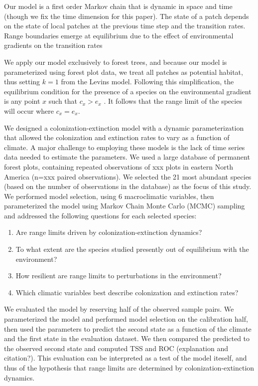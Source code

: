 \documentclass[11pt]{article}
\begin{document}
Our model is a first order Markov chain that is dynamic in space and time (though we fix the time dimension for this paper). The state of a patch depends on the state of local patches at the previous time step and the transition rates. Range boundaries emerge at equilibrium due to the effect of environmental gradients on the transition rates

We apply our model exclusively to forest trees, and because our model is parameterized using forest plot data, we treat all patches as potential habitat, thus setting $k=1$ from the Levins model.
Following this simplification, the equilibrium condition for the presence of a species on the environmental gradient is any point $x$ such that $c_x > e_x$ \citep{Holt2000}.
It follows that the range limit of the species will occur where $c_x = e_x$.


We designed a colonization-extinction model with a dynamic parameterization that allowed the colonization and extinction rates to vary as a function of climate.
A major challenge to employing these models is the lack of time series data needed to estimate the parameters.
We used a large database of permanent forest plots, containing repeated observations of xxx plots in eastern North America (n=xxx paired observations). 
We selected the 21 most abundant species (based on the number of observations in the database) as the focus of this study.
We performed model selection, using 6 macroclimatic variables, then parameterized the model using Markov Chain Monte Carlo (MCMC) sampling and addressed the following questions for each selected species:
\begin{enumerate}
	\item Are range limits driven by colonization-extinction dynamics?
	\item To what extent are the species studied presently out of equilibrium with the environment?
	\item How resilient are range limits to perturbations in the environment?
	\item Which climatic variables best describe colonization and extinction rates?
\end{enumerate}

We evaluated the model by reserving half of the observed sample pairs.
We parameterized the model and performed model selection on the calibration half, then used the parameters to predict the second state as a function of the climate and the first state in the evaluation dataset.
We then compared the predicted to the observed second state and computed TSS and ROC (explanation and citation?).
This evaluation can be interpreted as a test of the model iteself, and thus of the hypothesis that range limits are determined by colonization-extinction dynamics.
\end{document}
